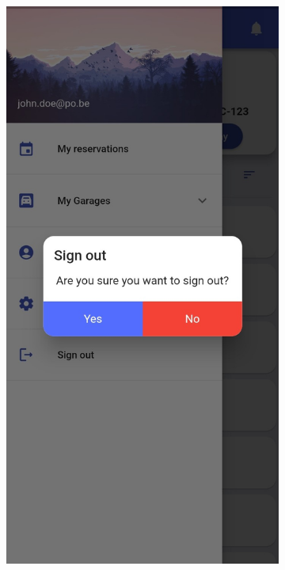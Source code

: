 \begin{figure}[!htp]
     \centering
     \begin{subfigure}[b]{0.30\textwidth}
         \centering
         \includegraphics[width=\textwidth]{images/app/dialog3.jpg}

\end{subfigure}
\end{figure}
